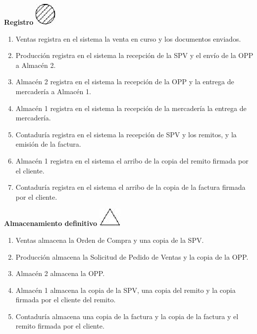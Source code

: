 \begin{center}
  \textbf{Registro}
  \includegraphics{./Images/Simbolos/simbolo-Registro.png}
\end{center}
\begin{enumerate}
  \item Ventas registra en el sistema la venta en curso y los documentos enviados.
  \item Producci\'on registra en el sistema la recepci\'on de la SPV y el env\'io de la OPP a Almac\'en 2.
  \item Almac\'en 2 registra en el sistema la recepci\'on de la OPP y la entrega de mercader\'ia a Almac\'en 1.
  \item Almac\'en 1 registra en el sistema la recepci\'on de la mercader\'ia la entrega de mercader\'ia.
  \item Contadur\'ia registra en el sistema la recepci\'on de SPV y los remitos, y la emisi\'on de la factura.
  \item Almac\'en 1 registra en el sistema el arribo de la copia del remito firmada por el cliente.
  \item Contadur\'ia registra en el sistema el arribo de la copia de la factura firmada por el cliente.  
\end{enumerate}

\begin{center}
  \textbf{Almacenamiento definitivo}
  \includegraphics{./Images/Simbolos/simbolo-Almacenamiento-Definitivo.png}
\end{center}
\begin{enumerate}
  \item Ventas almacena la Orden de Compra y una copia de la SPV.
  \item Producci\'on almacena la Solicitud de Pedido de Ventas y la copia de la OPP.
  \item Almac\'en 2 almacena la OPP.
  \item Almac\'en 1 almacena la copia de la SPV, una copia del remito y la copia firmada por el cliente del remito.
  \item Contadur\'ia almacena una copia de la factura y la copia de la factura y el remito firmada por el cliente.  
\end{enumerate}

